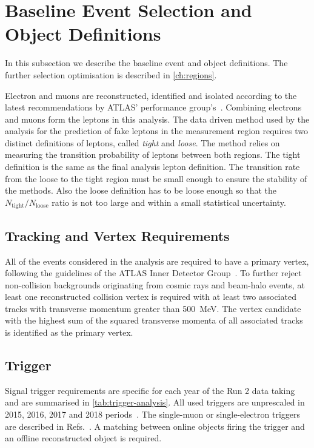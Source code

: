 \section{Baseline Event Selection and Object Definitions}%
\label{ch:definitions}

In this subsection we describe the baseline event and object definitions.
The further selection optimisation is described in \cref{ch:regions}.

Electron and muons are reconstructed, identified and isolated according to the latest
recommendations by ATLAS' performance group's~\cite{web:EGammaRecommendations, web:MuonRecommendations}.
Combining electrons and muons form the leptons in this analysis. The data driven method
used by the analysis for the prediction of fake leptons in the measurement region
requires two distinct definitions of leptons, called \textit{tight}
and \textit{loose}. The method relies on measuring the transition probability
of leptons between both regions. The tight definition is the same as the final
analysis lepton definition. The transition rate from the loose to the tight
region must be small enough to ensure the stability of the methods. Also the
loose definition has to be loose enough so that the
\( N_\mathrm{tight}/N_\mathrm{loose} \) ratio is not too large and within
a small statistical uncertainty.

\subsection{Tracking and Vertex Requirements}

All of the events considered in the analysis are required to have a primary
vertex, following the guidelines of the ATLAS Inner Detector
Group~\cite{web:TrackingRecommendations}.
To further reject non-collision backgrounds originating from cosmic rays and
beam-halo events, at least one reconstructed collision vertex is required with
at least two associated tracks with transverse momentum greater than
\qty{500}{\MeV}. The vertex candidate with the highest sum of the squared
transverse momenta of all associated tracks is identified as the primary vertex.

\subsection{Trigger}%
\label{sec:definitions-triggers}

Signal trigger requirements are specific for each year of the Run 2 data
taking and are summarised in \cref{tab:trigger-analysis}. All used
triggers are unprescaled in 2015, 2016, 2017 and 2018
periods~\cite{web:LowestUnprescaled}.
The single-muon or single-electron triggers are described in
Refs.~\cite{TRIG-2016-01,TRIG-2018-05,TRIG-2018-01,ATL-DAQ-PUB-2016-001,ATL-DAQ-PUB-2017-001,ATL-DAQ-PUB-2018-002,ATL-DAQ-PUB-2019-001}.  %
A matching between online objects firing the trigger and an offline reconstructed object is required.

